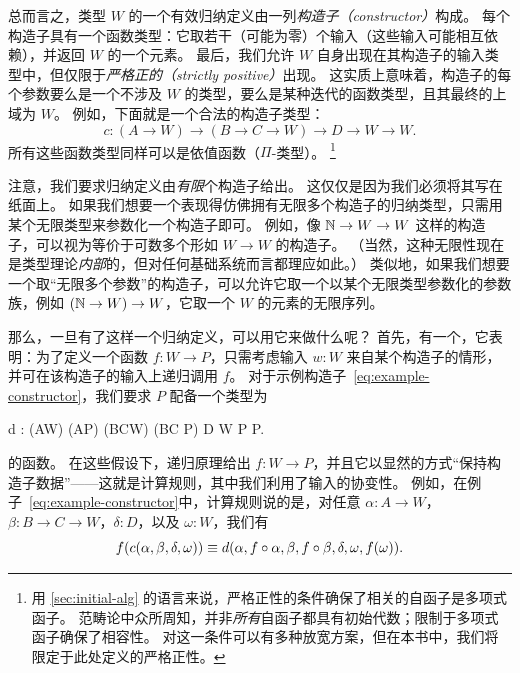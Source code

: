 %
总而言之，类型 $W$ 的一个有效归纳定义由一列\emph{构造子（constructor）}构成。
每个构造子具有一个函数类型：它取若干（可能为零）个输入（这些输入可能相互依赖），并返回 $W$ 的一个元素。
最后，我们允许 $W$ 自身出现在其构造子的输入类型中，但仅限于\emph{严格正的（strictly positive）}出现。
这实质上意味着，构造子的每个参数要么是一个不涉及 $W$ 的类型，要么是某种迭代的函数类型，且其最终的上域为 $W$。
例如，下面就是一个合法的构造子类型：
\begin{equation}
  c:(A\to W) \to (B\to C \to W) \to D \to W \to W.\label{eq:example-constructor}
\end{equation}
所有这些函数类型同样可以是依值函数（$\Pi$-类型）。%
\footnote{用 \cref{sec:initial-alg} 的语言来说，严格正性的条件确保了相关的自函子是多项式函子。 范畴论中众所周知，并非\emph{所有}自函子都具有初始代数；限制于多项式函子确保了相容性。 对这一条件可以有多种放宽方案，但在本书中，我们将限定于此处定义的严格正性。}

注意，我们要求归纳定义由\emph{有限}个构造子给出。
这仅仅是因为我们必须将其写在纸面上。
如果我们想要一个表现得仿佛拥有无限多个构造子的归纳类型，只需用某个无限类型来参数化一个构造子即可。
例如，像 $\mathbb{N} \to W \to W$ 这样的构造子，可以视为等价于可数多个形如 $W\to W$ 的构造子。
（当然，这种无限性现在是类型理论\emph{内部}的，但对任何基础系统而言都理应如此。）
类似地，如果我们想要一个取“无限多个参数”的构造子，可以允许它取一个以某个无限类型参数化的参数族，例如 $(\mathbb{N}\to W) \to W$，它取一个 $W$ 的元素的无限序列。

%
那么，一旦有了这样一个归纳定义，可以用它来做什么呢？
首先，有一个，它表明：为了定义一个函数 $f:W\to P$，只需考虑输入 $w:W$ 来自某个构造子的情形，并可在该构造子的输入上递归调用 $f$。
对于示例构造子~\eqref{eq:example-constructor}，我们要求 $P$ 配备一个类型为
\begin{narrowmultline}\label{eq:example-rechyp}
  d : (A\to W) \to (A\to P) \to (B\to C\to W) \to
  \narrowbreak
  (B\to C \to P) \to D \to W \to P \to P.
\end{narrowmultline}
的函数。
在这些假设下，递归原理给出 $f:W\to P$，并且它以显然的方式“保持构造子数据”——这就是计算规则，其中我们利用了输入的协变性。
%
例如，在例子~\eqref{eq:example-constructor}中，计算规则说的是，对任意 $\alpha:A\to W$，$\beta:B\to C\to W$，$\delta:D$，以及 $\omega:W$，我们有
\begin{equation}
  f(c(\alpha,\beta,\delta,\omega)) \equiv d(\alpha,f\circ \alpha,\beta, f\circ \beta, \delta, \omega,f(\omega)).\label{eq:example-comp}
\end{equation}

